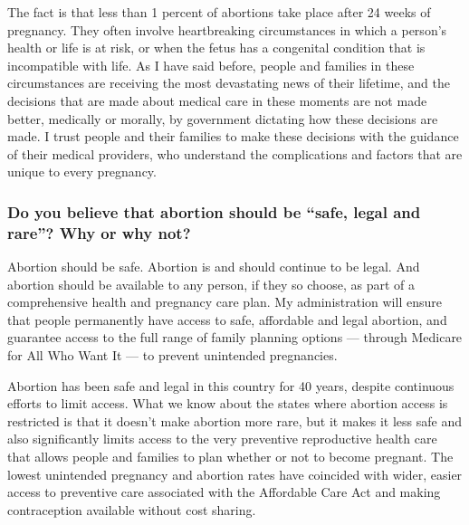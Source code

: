 The fact is that less than 1 percent of abortions take place after 24
weeks of pregnancy. They often involve heartbreaking circumstances in
which a person's health or life is at risk, or when the fetus has a
congenital condition that is incompatible with life. As I have said
before, people and families in these circumstances are receiving the
most devastating news of their lifetime, and the decisions that are made
about medical care in these moments are not made better, medically or
morally, by government dictating how these decisions are made. I trust
people and their families to make these decisions with the guidance of
their medical providers, who understand the complications and factors
that are unique to every pregnancy.

\hypertarget{do-you-believe-that-abortion-should-be-safe-legal-and-rare-why-or-why-not-2}{%
\subsubsection{Do you believe that abortion should be ``safe, legal and
rare''? Why or why
not?}\label{do-you-believe-that-abortion-should-be-safe-legal-and-rare-why-or-why-not-2}}

Abortion should be safe. Abortion is and should continue to be legal.
And abortion should be available to any person, if they so choose, as
part of a comprehensive health and pregnancy care plan. My
administration will ensure that people permanently have access to safe,
affordable and legal abortion, and guarantee access to the full range of
family planning options --- through Medicare for All Who Want It --- to
prevent unintended pregnancies.

Abortion has been safe and legal in this country for 40 years, despite
continuous efforts to limit access. What we know about the states where
abortion access is restricted is that it doesn't make abortion more
rare, but it makes it less safe and also significantly limits access to
the very preventive reproductive health care that allows people and
families to plan whether or not to become pregnant. The lowest
unintended pregnancy and abortion rates have coincided with wider,
easier access to preventive care associated with the Affordable Care Act
and making contraception available without cost sharing.

